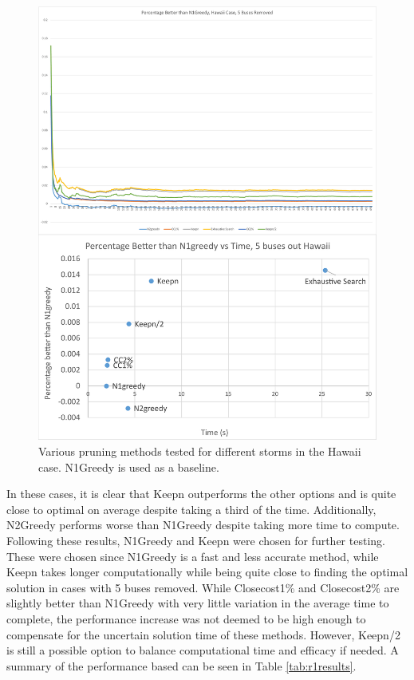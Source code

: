 \documentclass[12pt]{article}
\begin{document}
\begin{figure}[ht]
    \centering %
    \includegraphics[scale = 0.24]{Hawaii5busr1.pdf}
    \caption[Initial Testing - 5 buses removed, Texas Case]{Various pruning methods tested for different storms in the Hawaii case. N1Greedy is used as a baseline.}
    \label{fig:Hawaii5busr1}
\end{figure}
In these cases, it is clear that Keepn outperforms the other options and is quite close to optimal on average despite taking a third of the time. Additionally, N2Greedy performs worse than N1Greedy despite taking more time to compute. Following these results, N1Greedy and Keepn were chosen for further testing. These were chosen since N1Greedy is a fast and less accurate method, while Keepn takes longer computationally while being quite close to finding the optimal solution in cases with 5 buses removed. While Closecost1\% and Closecost2\% are slightly better than N1Greedy with very little variation in the average time to complete, the performance increase was not deemed to be high enough to compensate for the uncertain solution time of these methods. However, Keepn/2 is still a possible option to balance computational time and efficacy if needed. A summary of the performance based can be seen in Table \ref{tab:r1results}. \par
\end{document}
